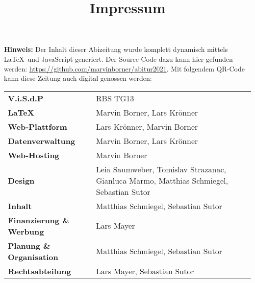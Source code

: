 \title{Impressum}


\textbf{Hinweis:} Der Inhalt dieser Abizeitung wurde komplett dynamisch mittels \LaTeX\  und JavaScript generiert. Der Source-Code dazu kann hier gefunden werden: \url{https://github.com/marvinborner/abitur2021}. Mit folgendem QR-Code kann diese Zeitung auch digital genossen werden:

\begin{center}
\end{center}

\begin{table}[b]
	\begin{tabular}{ l l }
		\textbf{V.i.S.d.P}               & RBS TG13                                           \\ %
		\textbf{\LaTeX}                  & Marvin Borner, Lars Krönner                        \\
		\textbf{Web-Plattform}           & Lars Krönner, Marvin Borner                        \\
		\textbf{Datenverwaltung}         & Marvin Borner, Lars Krönner \\
		\textbf{Web-Hosting}             & Marvin Borner                                      \\
		\textbf{Design}                  & Leia Saumweber, Tomislav Strazanac, Gianluca Marmo, Matthias Schmiegel, Sebastian Sutor  \\
		\textbf{Inhalt}                  & Matthias Schmiegel, Sebastian Sutor  \\
		\textbf{Finanzierung \& Werbung} & Lars Mayer                                         \\
		\textbf{Planung \& Organisation} & Matthias Schmiegel, Sebastian Sutor                \\
		\textbf{Rechtsabteilung} 		 & Lars Mayer, Sebastian Sutor
	\end{tabular}
\end{table}
